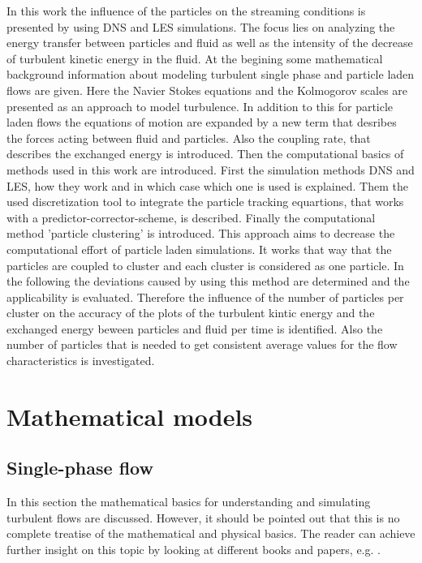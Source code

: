 \documentclass[11pt,a4paper,openany,oneside,parskip=half*]{article}
\begin{document}
\newline
In this work the influence of the particles on the streaming conditions is presented by using DNS and LES simulations. The focus lies on analyzing the energy transfer between particles and fluid as well as the intensity of the decrease of turbulent kinetic energy in the fluid.  
At the begining some mathematical background information about modeling turbulent single phase and particle laden flows are given. 
Here the Navier Stokes equations and the Kolmogorov scales are presented as an approach to model turbulence. In addition to this for particle laden flows the equations of motion are expanded by a new term that desribes the forces acting between fluid and particles. 
Also the coupling rate, that describes the exchanged energy is introduced.
Then the computational basics of methods used in this work are introduced. First the simulation methods DNS and LES, how they work and in which case which one is used is explained.
Them the used discretization tool to integrate the particle tracking equartions, that works with a predictor-corrector-scheme, is described.     
Finally the computational method 'particle clustering' is introduced. This approach aims to decrease the computational effort of particle laden simulations. It works that way that the particles are coupled to cluster and each cluster is considered as one particle.
\newline
In the following the deviations caused by using this method are determined and the applicability is evaluated. Therefore the influence of the number of particles per cluster on the accuracy of the plots of the turbulent kintic energy and the exchanged energy beween particles and fluid per time is identified.
Also the number of particles that is needed to get consistent average values for the flow characteristics is investigated.
\pagebreak
\section{Mathematical models}
\subsection{Single-phase flow} %
In this section the mathematical basics for understanding and simulating turbulent flows are discussed. However, it should be pointed out that this is no
complete treatise of the mathematical and physical basics. The reader can achieve further insight on this topic by looking at different books and papers, 
e.g. \cite{turbulentFlows}.
\newline
\end{document}
